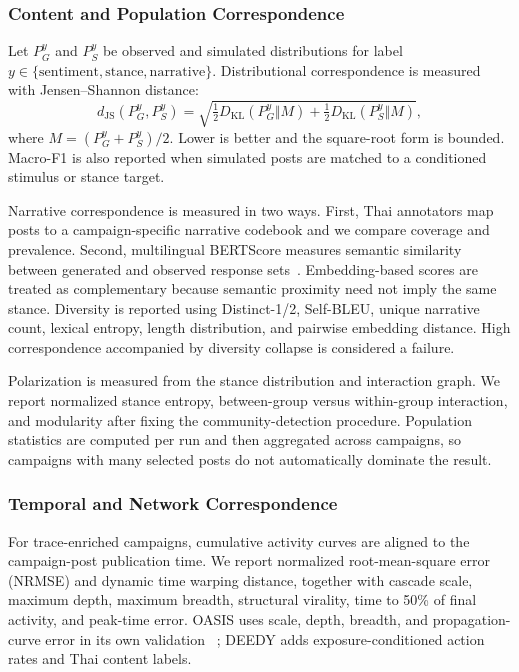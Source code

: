 \documentclass[conference]{IEEEtran}
\begin{document}
\subsubsection{Content and Population Correspondence}

Let $P_G^y$ and $P_S^y$ be observed and simulated distributions for label
$y\in\{\text{sentiment},\text{stance},\text{narrative}\}$. Distributional
correspondence is measured with Jensen--Shannon distance:
\begin{equation}
 d_{\mathrm{JS}}(P_G^y,P_S^y)=
 \sqrt{\tfrac{1}{2}D_{\mathrm{KL}}(P_G^y\Vert M)+
 \tfrac{1}{2}D_{\mathrm{KL}}(P_S^y\Vert M)},
\end{equation}
where $M=(P_G^y+P_S^y)/2$. Lower is better and the square-root form is bounded.
Macro-F1 is also reported when simulated posts are matched to a conditioned
stimulus or stance target.

Narrative correspondence is measured in two ways. First, Thai annotators map
posts to a campaign-specific narrative codebook and we compare coverage and
prevalence. Second, multilingual BERTScore measures semantic similarity between
generated and observed response sets~\cite{zhang2020bertscore}. Embedding-based
scores are treated as complementary because semantic proximity need not imply
the same stance. Diversity is reported using Distinct-1/2, Self-BLEU, unique
narrative count, lexical entropy, length distribution, and pairwise embedding
distance. High correspondence accompanied by diversity collapse is considered
a failure.

Polarization is measured from the stance distribution and interaction graph.
We report normalized stance entropy, between-group versus within-group
interaction, and modularity after fixing the community-detection procedure.
Population statistics are computed per run and then aggregated across
campaigns, so campaigns with many selected posts do not automatically dominate
the result.

\subsubsection{Temporal and Network Correspondence}

For trace-enriched campaigns, cumulative activity curves are aligned to the
campaign-post publication time. We report normalized root-mean-square error
(NRMSE) and dynamic time
warping distance, together with cascade scale, maximum depth, maximum breadth,
structural virality, time to 50\% of final activity, and peak-time error. OASIS
uses scale, depth, breadth, and propagation-curve error in its own validation
~\cite{yang2024oasis}; DEEDY adds exposure-conditioned action rates and Thai
content labels.
\end{document}
